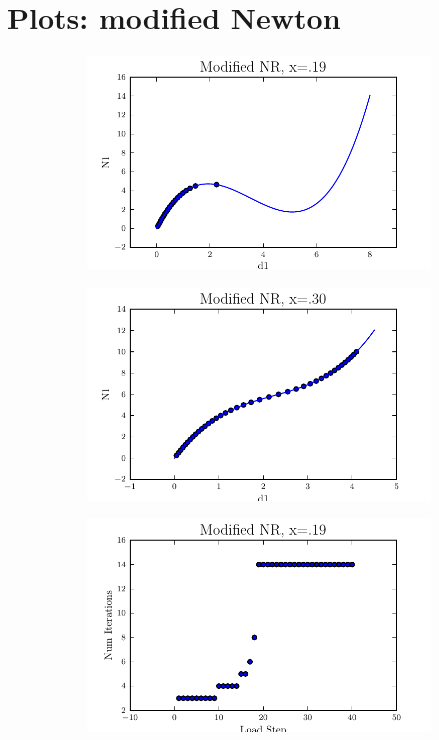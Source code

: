 \documentclass[10pt,letterpaper]{article}
\begin{document}
\section{Plots: modified Newton}
\begin{figure}[!tbh]
  \begin{subfigure}[b]{.6\textwidth}
    \includegraphics[width=\textwidth]{moded_nr_x19.pdf}
    \caption{}
    \label{fig3:label:a}
  \end{subfigure}
  \hfill
  \begin{subfigure}[b]{.6\textwidth}
    \includegraphics[width=\textwidth]{moded_nr_x30.pdf}
    \caption{}
    \label{fig3:label:b}
  \end{subfigure}
  \hfill
    \begin{subfigure}[b]{.6\textwidth}
    \includegraphics[width=\textwidth]{moded_nr_x19_conv.pdf}

\end{subfigure}
\end{figure}
\end{document}
